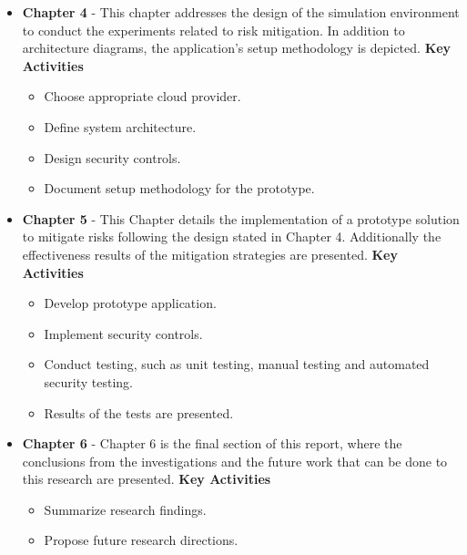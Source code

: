 \begin{itemize}
    \item \textbf{Chapter 4} - This chapter addresses the design of the simulation environment to conduct the experiments related to risk mitigation.
    In addition to architecture diagrams, the application's setup methodology is depicted.\newline
   \textbf{Key Activities}
   \begin{itemize}
        \item Choose appropriate cloud provider.
        \item Define system architecture.
        \item Design security controls.
        \item Document setup methodology for the prototype.
    \end{itemize}
    
    \item \textbf{Chapter 5} - This Chapter details the implementation of a prototype solution to mitigate risks following the design stated in Chapter 4. Additionally the effectiveness results of the mitigation strategies are presented.\newline
       \textbf{Key Activities}
   \begin{itemize}
        \item Develop prototype application.
        \item Implement security controls.
        \item Conduct testing, such as unit testing, manual testing and automated security testing.
        \item Results of the tests are presented.
    \end{itemize}
    
    \item \textbf{Chapter 6} - Chapter 6 is the final section of this report, where the conclusions from the investigations and the future work that can be done to this research are presented.\newline
       \textbf{Key Activities}
        \begin{itemize}
            \item Summarize research findings.
            \item Propose future research directions.
        \end{itemize}

\end{itemize}